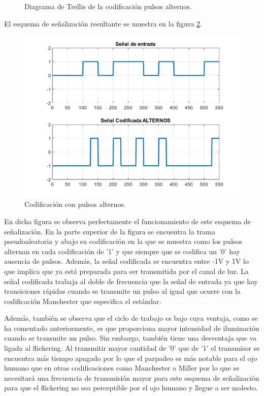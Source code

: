\begin{figure}[ht]
    \centering
    
    \caption{\small{Diagrama de Trellis de la codificación pulsos alternos.}}
    \label{trellis_alternos}%
\end{figure}

El esquema de señalización resultante se muestra en la figura \ref{codificacion_alternos}.

\begin{figure}[ht]
    \centering
    \includegraphics[scale=0.5]{./figuras/CodificadaAlternos.pdf}
    \caption{\small{Codificación con pulsos alternos.}}
    \label{codificacion_alternos}%
\end{figure}

En dicha figura se observa perfectamente el funcionamiento de este esquema de 
señalización. En la parte superior de la figura se encuentra la trama pseudoaleatoria y 
abajo su codificación en la que se muestra como los pulsos alternan en cada codificación 
de '1' y que siempre que se codifica un '0' hay ausencia de pulsos. Además, la señal 
codificada se encuentra entre -1V y 1V lo que implica que ya está preparada para ser 
transmitida por el canal de luz. La señal codificada trabaja al doble de frecuencia que 
la señal de entrada ya que hay transiciones rápidas cuando se transmite un pulso al igual
que ocurre con la codificación Manchester que especifica el estándar.

Además, también se observa que el ciclo de trabajo es bajo cuya ventaja, como se ha 
comentado anteriormente, es que proporciona mayor intensidad de iluminación cuando se 
transmite un pulso. Sin embargo, también tiene una desventaja que va ligada al flickering.
Al transmitir mayor cantidad de '0' que de '1' el transmisor se encuentra más tiempo 
apagado por lo que el parpadeo es más notable para el ojo humano que en otras 
codificaciones como Manchester o Miller por lo que se necesitará una frecuencia de 
transmisión mayor para este esquema de señalización para que el flickering no sea 
perceptible por el ojo humano y llegue a ser molesto.

